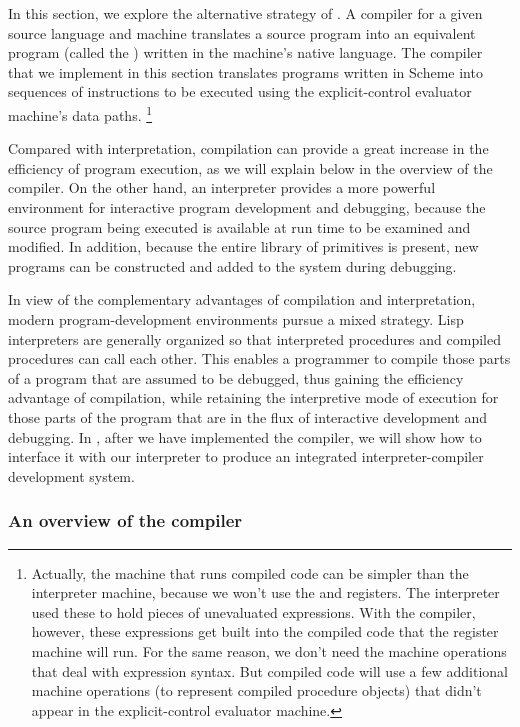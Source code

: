 In this section, we explore the alternative strategy of .
A compiler for a given source language and machine translates a source program into an equivalent program (called the ) written in the machine’s native language.
The compiler that we implement in this section translates programs written in Scheme into sequences of instructions to be executed using the explicit-control evaluator machine’s data paths.%
\footnote{
	Actually, the machine that runs compiled code can be simpler than the interpreter machine, because we won’t use the  and  registers.
	The interpreter used these to hold pieces of unevaluated expressions.
	With the compiler, however, these expressions get built into the compiled code that the register machine will run.
	For the same reason, we don’t need the machine operations that deal with expression syntax.
	But compiled code will use a few additional machine operations (to represent compiled procedure objects) that didn’t appear in the explicit-control evaluator machine.
}

Compared with interpretation, compilation can provide a great increase in the efficiency of program execution, as we will explain below in the overview of the compiler.
On the other hand, an interpreter provides a more powerful environment for interactive program development and debugging, because the source program being executed is available at run time to be examined and modified.
In addition, because the entire library of primitives is present, new programs can be constructed and added to the system during debugging.

In view of the complementary advantages of compilation and interpretation, modern program-development environments pursue a mixed strategy.
Lisp interpreters are generally organized so that interpreted procedures and compiled procedures can call each other.
This enables a programmer to compile those parts of a program that are assumed to be debugged, thus gaining the efficiency advantage of compilation, while retaining the interpretive mode of execution for those parts of the program that are in the flux of interactive development and debugging.
In , after we have implemented the compiler, we will show how to interface it with our interpreter to produce an integrated interpreter-compiler development system.



\subsubsection*{An overview of the compiler}

